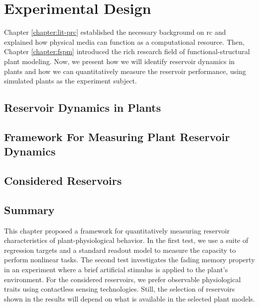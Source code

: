 \chapter{Experimental Design} \label{chapter:exp-setup}

 Chapter \ref{chapter:lit-prc} established the necessary background on \acrshort{rc} and explained how physical media can function as a computational resource.
Then, Chapter \ref{chapter:fspm} introduced the rich research field of functional-structural plant modeling.
Now, we present how we will identify reservoir dynamics in plants and how we can quantitatively measure the reservoir performance, using simulated plants as the experiment subject.


\section{Reservoir Dynamics in Plants}



\section{Framework For Measuring Plant Reservoir Dynamics}



\section{Considered Reservoirs} \label{sec:considered-reservoirs}



\section{Summary}

This chapter proposed a framework for quantitatively measuring reservoir characteristics of plant-physiological behavior.
In the first test, we use a suite of regression targets and a standard readout model to measure the capacity to perform nonlinear tasks.
The second test investigates the fading memory property in an experiment where a brief artificial stimulus is applied to the plant's environment.
For the considered reservoirs, we prefer observable physiological traits using contactless sensing technologies. 
Still, the selection of reservoirs shown in the results will depend on what is available in the selected plant models.





